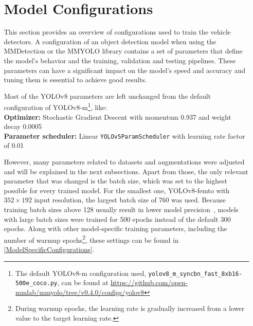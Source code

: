 \section{Model Configurations}


This section provides an overview of configurations used to train the vehicle
detectors. A configuration of an object detection model when using the
MMDetection or the MMYOLO library contains a set of parameters that define the
model's behavior and the training, validation and testing pipelines. These
parameters can have a significant impact on the model's speed and accuracy and
tuning them is essential to achieve good results.

Most of the YOLOv8 parameters are left unchanged from the default configuration
of YOLOv8-m\footnote{The default YOLOv8-m configuration used,
\texttt{yolov8\_m\_syncbn\_fast\_8xb16-500e\_coco.py}, can be found at
\url{https://github.com/open-mmlab/mmyolo/tree/v0.4.0/configs/yolov8}}, like: \\
\textbf{Optimizer:} Stochastic Gradient Descent with momentum \num{0.937} and weight decay \num{0.0005} \\
\textbf{Parameter scheduler:} Linear \verb|YOLOv5ParamScheduler| with learning rate factor of \num{0.01}

However, many parameters related to datasets and augmentations were adjusted and
will be explained in the next subsections. Apart from those, the only relevant
parameter that was changed is the batch size, which was set to the highest
possible for every trained model. For the smallest one, YOLOv8-femto with $352
\times 192$ input resolution, the largest batch size of 760 was used. Because
training batch sizes above 128 usually result in lower model precision~\cite{LargeBatch}, models
with large batch sizes were trained for 500 epochs instead of the default 300
epochs. Along with other model-specific training parameters, including the
number of warmup epochs\footnote{During warmup epochs, the learning rate is
gradually increased from a lower value to the target learning rate.}, these
settings can be found in \autoref{ModelSpecificConfigurations}.


